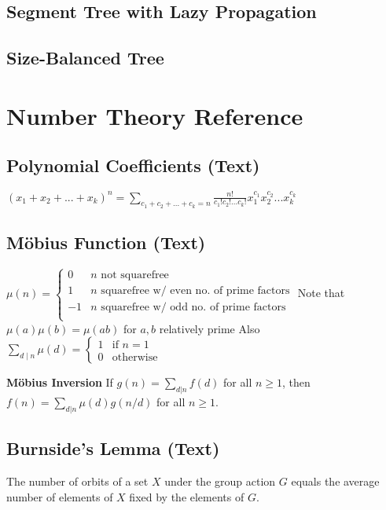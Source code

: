 \documentclass[9pt]{extarticle}
\begin{document}
\begin{multicols*}{3}
\subsection{Segment Tree with Lazy Propagation} %


\subsection{Size-Balanced Tree}


\section{Number Theory Reference}
\subsection{Polynomial Coefficients (Text)} %
$(x_1 + x_2 + ... + x_k)^n = \sum_{c_1 + c_2 + ... + c_k = n}
\frac{n!}{c_1! c_2! ... c_k!} x_1^{c_1} x_2^{c_2} ... x_k^{c_k}$

\subsection{M\"obius Function (Text)} %
$\mu(n) = \begin{cases}
0 & \text{$n$ not squarefree} \\
1 & \text{$n$ squarefree w/ even no. of prime factors} \\
-1 & \text{$n$ squarefree w/ odd no. of prime factors} \\
\end{cases}$
Note that $\mu(a) \mu(b) = \mu(ab)$ for $a, b$ relatively prime
Also $\sum_{d \mid n} \mu(d) = \begin{cases} 1 & \text{if $n = 1$} \\
0 & \text{otherwise} \end{cases}$

\textbf{M\"obius Inversion}
If $g(n) = \sum_{d|n} f(d)$ for all $n \ge 1$, then
$f(n) = \sum_{d|n} \mu(d)g(n/d)$ for all $n \ge 1$.

\subsection{Burnside's Lemma (Text)} %
The number of orbits of a set $X$ under the group action $G$ equals the average
number of elements of $X$ fixed by the elements of $G$.


\end{multicols*}
\end{document}
